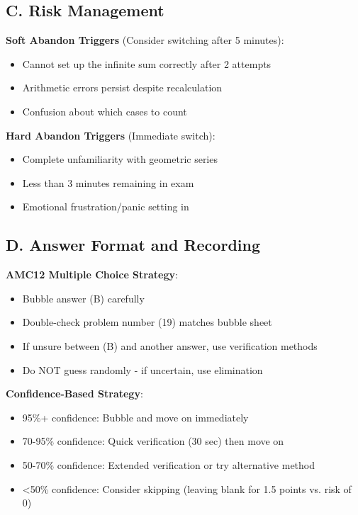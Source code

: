 \documentclass[11pt]{article}
\begin{document}
\begin{competitionbox}
\subsection*{C. Risk Management}

\textbf{Soft Abandon Triggers} (Consider switching after 5 minutes):
\begin{itemize}
    \item Cannot set up the infinite sum correctly after 2 attempts
    \item Arithmetic errors persist despite recalculation
    \item Confusion about which cases to count
\end{itemize}

\textbf{Hard Abandon Triggers} (Immediate switch):
\begin{itemize}
    \item Complete unfamiliarity with geometric series
    \item Less than 3 minutes remaining in exam
    \item Emotional frustration/panic setting in
\end{itemize}

\subsection*{D. Answer Format and Recording}

\textbf{AMC12 Multiple Choice Strategy}:
\begin{itemize}
    \item Bubble answer (B) carefully
    \item Double-check problem number (19) matches bubble sheet
    \item If unsure between (B) and another answer, use verification methods
    \item Do NOT guess randomly - if uncertain, use elimination
\end{itemize}

\textbf{Confidence-Based Strategy}:
\begin{itemize}
    \item 95\%+ confidence: Bubble and move on immediately
    \item 70-95\% confidence: Quick verification (30 sec) then move on
    \item 50-70\% confidence: Extended verification or try alternative method
    \item <50\% confidence: Consider skipping (leaving blank for 1.5 points vs. risk of 0)
\end{itemize}


\end{competitionbox}
\end{document}
